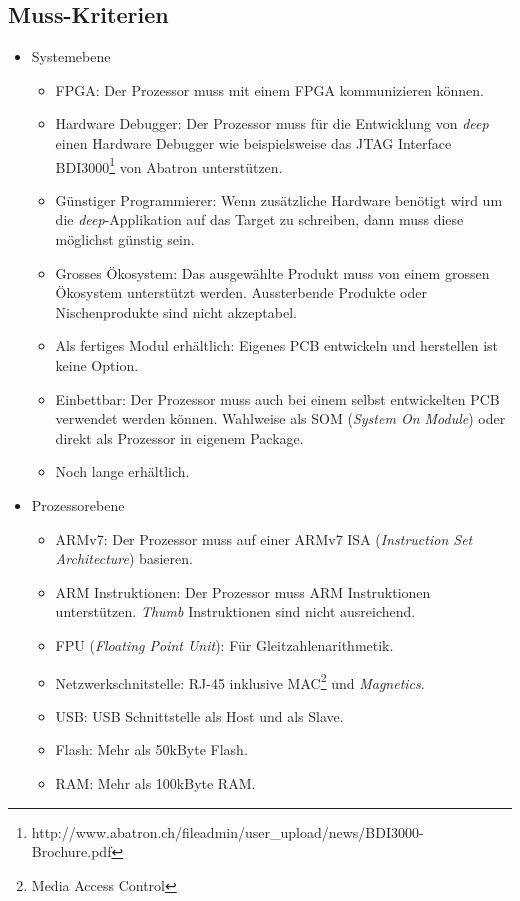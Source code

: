 \subsection{Muss-Kriterien}
\begin{itemize}
\item Systemebene
	\begin{itemize}
	\item FPGA: Der Prozessor muss mit einem FPGA kommunizieren können.
	\item Hardware Debugger: Der Prozessor muss für die Entwicklung von \textit{deep} einen Hardware Debugger wie beispielsweise das JTAG Interface BDI3000\footnote{http://www.abatron.ch/fileadmin/user\_upload/news/BDI3000-Brochure.pdf} von Abatron unterstützen. 
	\item Günstiger Programmierer: Wenn zusätzliche Hardware benötigt wird um die \textit{deep}-Applikation auf das Target zu schreiben, dann muss diese möglichst günstig sein.
	\item Grosses Ökosystem: Das ausgewählte Produkt muss von einem grossen Ökosystem unterstützt werden. Aussterbende Produkte oder Nischenprodukte sind nicht akzeptabel.
	\item Als fertiges Modul erhältlich: Eigenes PCB entwickeln und herstellen ist keine Option.
	\item Einbettbar: Der Prozessor muss auch bei einem selbst entwickelten PCB verwendet werden können. Wahlweise als SOM (\textit{System On Module}) oder direkt als Prozessor in eigenem Package.
	\item Noch lange erhältlich.
	\end{itemize}
\item Prozessorebene
	\begin{itemize}
	\item ARMv7: Der Prozessor muss auf einer ARMv7 ISA (\textit{Instruction Set Architecture}) basieren.
	\item ARM Instruktionen: Der Prozessor muss ARM Instruktionen unterstützen. \textit{Thumb} Instruktionen sind nicht ausreichend.
	\item FPU (\textit{Floating Point Unit}): Für Gleitzahlenarithmetik.
	\item Netzwerkschnitstelle: RJ-45 inklusive MAC\footnote{Media Access Control} und \textit{Magnetics}.
	\item USB: USB Schnittstelle als Host und als Slave.
	\item Flash: Mehr als 50kByte Flash.
	\item RAM: Mehr als 100kByte RAM.
	\end{itemize}
\end{itemize}


